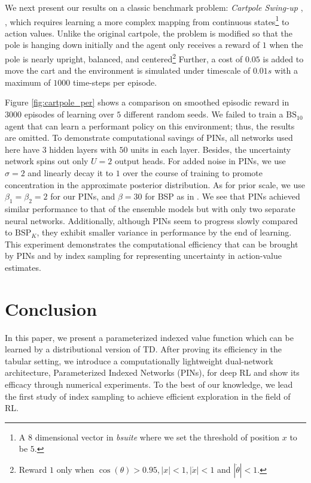 \documentclass[letterpaper]{article} %
\newcommand{\abs}[1]{\left|#1\right|}
\theoremstyle{definition}
\begin{document}
We next present our results on a classic benchmark problem: \textit{Cartpole Swing-up} \cite{sutton2018reinforcement}, \cite{osband2019bsuite}, which requires learning a more complex mapping from continuous states\footnote{A $8$ dimensional vector in \textit{bsuite} where we set the threshold of position $x$ to be $5$.} to action values. Unlike the original cartpole, the problem is modified so that the pole is hanging down initially and the agent only receives a reward of $1$ when the pole is nearly upright, balanced, and centered\footnote{Reward $1$ only when $\cos(\theta) > 0.95, \abs{x} < 1, \abs{\Dot{x}} < 1$ and $|\Dot{\theta}| < 1$.} Further, a cost of $0.05$ is added to move the cart and the environment is simulated under timescale of $0.01s$ with a maximum of $1000$ time-steps per episode.

Figure \ref{fig:cartpole_per} shows a comparison on smoothed episodic reward in $3000$ episodes of learning over $5$ different random seeds. We failed to train a $\mathrm{BS}_{10}$ agent that can learn a performant policy on this environment; thus, the results are omitted. To demonstrate computational savings of PINs, all networks used here have $3$ hidden layers with $50$ units in each layer. Besides, the uncertainty network spins out only $U=2$ output heads. For added noise in PINs, we use $\sigma=2$ and linearly decay it to $1$ over the course of training to promote concentration in the approximate posterior distribution. As for prior scale, we use $\beta_1=\beta_2=2$ for our PINs, and $\beta=30$ for BSP as in \cite{osband2018randomized}. We see that PINs achieved similar performance to that of the ensemble models but with only two separate neural networks. Additionally, although PINs seem to progress slowly compared to $\mathrm{BSP}_K$, they exhibit smaller variance in performance by the end of learning. This experiment demonstrates the computational efficiency that can be brought by PINs and by index sampling for representing uncertainty in action-value estimates.

\section{Conclusion}

In this paper, we present a parameterized indexed value function which can be learned by a distributional version of TD. After proving its efficiency in the tabular setting, we introduce a computationally lightweight dual-network architecture, Parameterized Indexed Networks (PINs), for deep RL and show its efficacy through numerical experiments. To the best of our knowledge, we lead the first study of index sampling to achieve efficient exploration in the field of RL.
\end{document}

